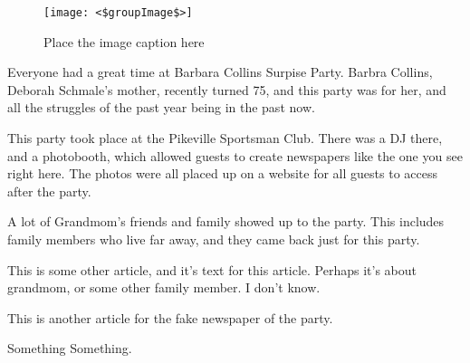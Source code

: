 \documentclass[letterpaper]{article}
\date{\today}
\begin{document}
\maketitle

\begin{figure}[h]
    \centering
    \texttt{[image: <\$groupImage\$>]}
    \caption{Place the image caption here}
\end{figure}

\begin{multicols}{3}
    Everyone had a great time at Barbara Collins Surpise Party. Barbra
    Collins, Deborah Schmale's mother, recently turned 75, and this party
    was for her, and all the struggles of the past year being in the past
    now.
    
    This party
    took place at the Pikeville Sportsman Club. There was a DJ there, and a
    photobooth, which allowed guests to create newspapers like the one you
    see right here. The photos were all placed up on a website for all
    guests to access after the party.

    A lot of Grandmom's friends and family showed up to the party. This
    includes family members who live far away, and they came back just for
    this party.

    \closearticle

    This is some other article, and it's text for this article. Perhaps it's
    about grandmom, or some other family member. I don't know.
    
    \closearticle

    This is another article for the fake newspaper of the party.

    Something Something.

    \closearticle

\end{multicols}
\end{document}
